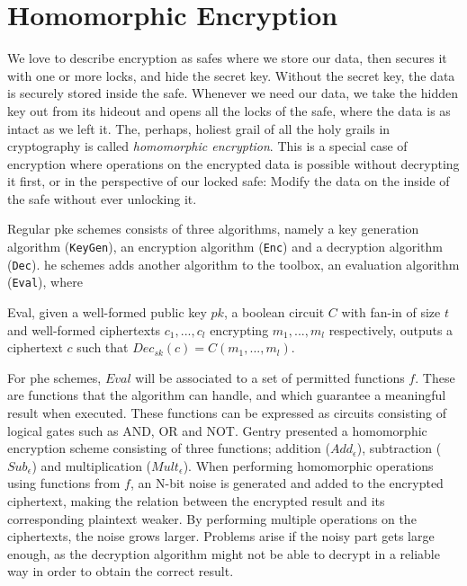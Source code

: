 \section{Homomorphic Encryption}

We love to describe encryption as safes where we store our data, then secures it with one or more locks, and hide the secret key. Without the secret key, the data is securely stored inside the safe. Whenever we need our data, we take the hidden key out from its hideout and opens all the locks of the safe, where the data is as intact as we left it. The, perhaps, holiest grail of all the holy grails in cryptography is called \emph{homomorphic encryption}. This is a special case of encryption where operations on the encrypted data is possible without decrypting it first, or in the perspective of our locked safe: Modify the data on the inside of the safe without ever unlocking it.

Regular \gls{pke} schemes consists of three algorithms, namely a key generation algorithm (\texttt{KeyGen}), an encryption algorithm (\texttt{Enc}) and a decryption algorithm (\texttt{Dec}). \gls{he} schemes adds another algorithm to the toolbox, an evaluation algorithm (\texttt{Eval}), where

\begin{theorem}

Eval, given a well-formed public key $pk$, a boolean circuit $C$ with fan-in of size $t$ and well-formed ciphertexts $c_1, ... , c_l$ encrypting $m_1, ..., m_l$ respectively, outputs a ciphertext $c$ such that $Dec_{sk}(c) = C(m_1, ..., m_l)$.

\end{theorem}

For \gls{phe} schemes, $Eval$ will be associated to a set of permitted functions $f$. These are functions that the algorithm can handle, and which guarantee a meaningful result when executed. These functions can be expressed as circuits consisting of logical gates such as AND, OR and NOT. Gentry \cite{Gentry_computing_arb_func_enc_data} presented a homomorphic encryption scheme consisting of three functions; addition ($Add_{\epsilon}$), subtraction ($Sub_{\epsilon}$) and multiplication ($Mult_{\epsilon}$). When performing homomorphic operations using functions from $f$, an N-bit noise is generated and added to the encrypted ciphertext, making the relation between the encrypted result and its corresponding plaintext weaker. By performing multiple operations on the ciphertexts, the noise grows larger. Problems arise if the noisy part gets large enough, as the decryption algorithm might not be able to decrypt in a reliable way in order to obtain the correct result.


